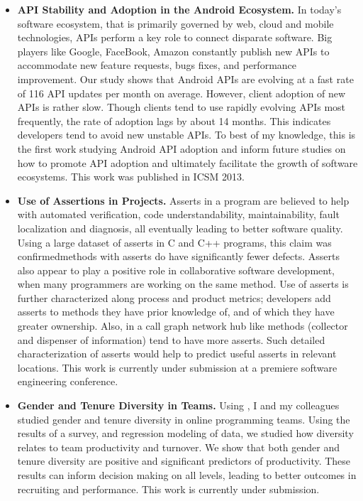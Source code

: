 \documentclass[a4paper, 11pt]{article}
\begin{document}
\begin{small}
\begin{itemize}
  \item{\textbf{API Stability and Adoption in the Android Ecosystem.}}
    In today's software ecosystem, that is primarily governed by web, cloud and mobile
    technologies, APIs perform a key role to connect disparate software.  Big players like
    Google, FaceBook, Amazon constantly publish new APIs to accommodate new feature requests,
    bugs fixes, and performance improvement.  Our study shows that Android APIs are evolving at
    a fast rate of 116 API updates per month on average. However, client adoption of new APIs
    is rather slow.  Though clients tend to use rapidly evolving APIs most frequently, the rate
    of adoption lags by about 14 months.  This indicates developers tend to avoid new unstable
    APIs. To best of my knowledge, this is the first work studying Android API adoption and
    inform future studies on how to promote API adoption and ultimately facilitate the growth
    of software ecosystems. This work was published in ICSM 2013.

  
  \item{\textbf{Use of Assertions in \gh Projects.}}
     Asserts in a program are believed to help with automated verification, code
     understandability, maintainability, fault localization and diagnosis, all eventually
     leading to better software quality. Using a large dataset of asserts in C and C++
     programs, this claim was confirmed\textemdash methods with asserts do have significantly
     fewer defects. Asserts also appear to play a positive role in collaborative software
     development, when many programmers are working on the same method.  Use of asserts is
     further characterized along process and product metrics; developers add asserts to methods
     they have prior knowledge of, and of which they have greater ownership. Also, in a call
     graph network hub like methods (collector and dispenser of information) tend to have more
     asserts. Such detailed characterization of asserts would help to predict useful asserts in
     relevant locations.  This work is currently under submission at a premiere software
     engineering conference.

  \item{\textbf{Gender and Tenure Diversity in \gh Teams.}}
    Using \gh, I and my colleagues studied gender and tenure diversity in online programming teams.
    Using the results of a survey, and regression modeling of \gh data, we studied how diversity
    relates to team productivity and turnover. We show that both gender and tenure diversity are
    positive and significant predictors of productivity.  These results can inform decision making
    on all levels, leading to better outcomes in recruiting and performance.  This work is
    currently under submission. 
     

\end{itemize}
\end{small}
\end{document}
